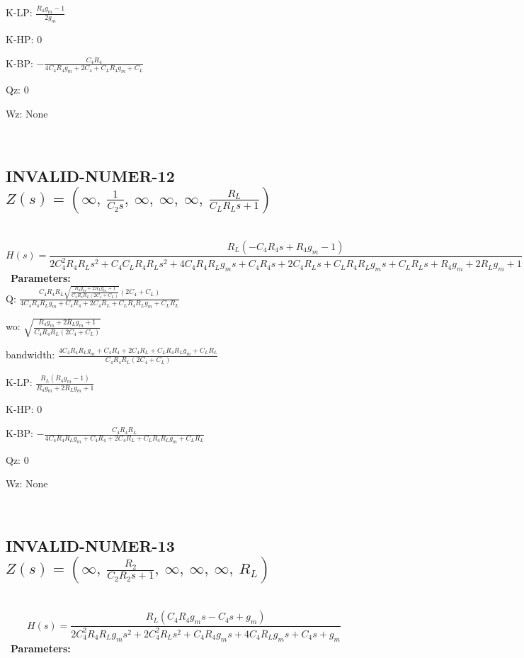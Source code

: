 \documentclass{article}
\begin{document}
K-LP: $\frac{R_{4} g_{m} - 1}{2 g_{m}}$\ 

K-HP: $0$\ 

K-BP: $- \frac{C_{4} R_{4}}{4 C_{4} R_{4} g_{m} + 2 C_{4} + C_{L} R_{4} g_{m} + C_{L}}$\ 

Qz: $0$\ 

Wz: $\text{None}$\ 

\ 

\subsection{INVALID-NUMER-12 $Z(s) = \left( \infty, \  \frac{1}{C_{2} s}, \  \infty, \  \infty, \  \infty, \  \frac{R_{L}}{C_{L} R_{L} s + 1}\right)$ } \ 
\textbf{\[H(s) = \frac{R_{L} \left(- C_{4} R_{4} s + R_{4} g_{m} - 1\right)}{2 C_{4}^{2} R_{4} R_{L} s^{2} + C_{4} C_{L} R_{4} R_{L} s^{2} + 4 C_{4} R_{4} R_{L} g_{m} s + C_{4} R_{4} s + 2 C_{4} R_{L} s + C_{L} R_{4} R_{L} g_{m} s + C_{L} R_{L} s + R_{4} g_{m} + 2 R_{L} g_{m} + 1}\] } \ 
\textbf{Parameters:}\\ 

Q: $\frac{C_{4} R_{4} R_{L} \sqrt{\frac{R_{4} g_{m} + 2 R_{L} g_{m} + 1}{C_{4} R_{4} R_{L} \left(2 C_{4} + C_{L}\right)}} \left(2 C_{4} + C_{L}\right)}{4 C_{4} R_{4} R_{L} g_{m} + C_{4} R_{4} + 2 C_{4} R_{L} + C_{L} R_{4} R_{L} g_{m} + C_{L} R_{L}}$\ 

wo: $\sqrt{\frac{R_{4} g_{m} + 2 R_{L} g_{m} + 1}{C_{4} R_{4} R_{L} \left(2 C_{4} + C_{L}\right)}}$\ 

bandwidth: $\frac{4 C_{4} R_{4} R_{L} g_{m} + C_{4} R_{4} + 2 C_{4} R_{L} + C_{L} R_{4} R_{L} g_{m} + C_{L} R_{L}}{C_{4} R_{4} R_{L} \left(2 C_{4} + C_{L}\right)}$\ 

K-LP: $\frac{R_{L} \left(R_{4} g_{m} - 1\right)}{R_{4} g_{m} + 2 R_{L} g_{m} + 1}$\ 

K-HP: $0$\ 

K-BP: $- \frac{C_{4} R_{4} R_{L}}{4 C_{4} R_{4} R_{L} g_{m} + C_{4} R_{4} + 2 C_{4} R_{L} + C_{L} R_{4} R_{L} g_{m} + C_{L} R_{L}}$\ 

Qz: $0$\ 

Wz: $\text{None}$\ 

\ 

\subsection{INVALID-NUMER-13 $Z(s) = \left( \infty, \  \frac{R_{2}}{C_{2} R_{2} s + 1}, \  \infty, \  \infty, \  \infty, \  R_{L}\right)$ } \ 
\textbf{\[H(s) = \frac{R_{L} \left(C_{4} R_{4} g_{m} s - C_{4} s + g_{m}\right)}{2 C_{4}^{2} R_{4} R_{L} g_{m} s^{2} + 2 C_{4}^{2} R_{L} s^{2} + C_{4} R_{4} g_{m} s + 4 C_{4} R_{L} g_{m} s + C_{4} s + g_{m}}\] } \ 
\textbf{Parameters:}\\ 
\end{document}
